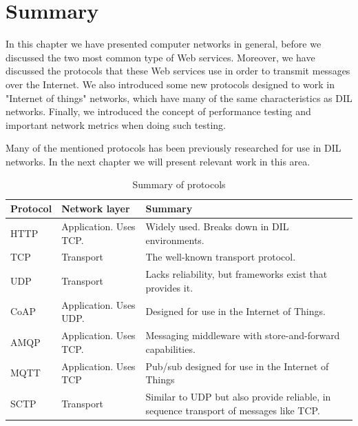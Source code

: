 \section{Summary}

In this chapter we have presented computer networks in general, before we
discussed the two most common type of Web services. Moreover, we have discussed
the protocols that these Web services use in order to transmit messages over the
Internet. We also introduced some new protocols designed to work in "Internet of
things" networks, which have many of the same characteristics as DIL networks.
Finally, we introduced the concept of performance testing and important network
metrics when doing such testing.

Many of the mentioned protocols has been previously researched for use in DIL
networks. In the next chapter we will present relevant work in this area.

\begin{table}[h]
\begin{tabularx}{\textwidth}{| l | l | X |}
\hline
  \textbf{Protocol} & \textbf{Network layer} & \textbf{Summary} \\ \hline
  HTTP & Application. Uses TCP. &  Widely used. Breaks down in DIL environments.\\ \hline
  TCP & Transport & The well-known transport protocol. \\ \hline
  UDP & Transport & Lacks reliability, but frameworks exist that provides it. \\ \hline
  CoAP & Application. Uses UDP. & Designed for use in the Internet of Things. \\ \hline
  AMQP & Application. Uses TCP. &  Messaging middleware with store-and-forward capabilities.\\ \hline
  MQTT & Application. Uses TCP & Pub/sub designed for use in the Internet of Things\\ \hline
  SCTP & Transport & Similar to UDP but also provide reliable, in sequence transport of messages like TCP. \\ \hline
\end{tabularx}
\caption{Summary of protocols}
\end{table}
